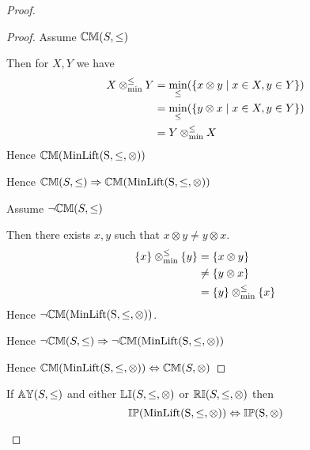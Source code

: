 \begin{proof}
\begin{proof}

\vspace{0.5em}

Assume ${\mathbb{CM}}(S,\leq)$

\begin{ind}
Then for $X,Y$ we have
\begin{align*}
X \mathbin{\otimes_{\min}^{\leq}} Y 	& = \min_\leq(\{x \otimes y \mid x \in X, y \in Y\}) \\
				& = \min_\leq(\{y \otimes x \mid x \in X, y \in Y\}) \\
				& = Y \mathbin{\otimes_{\min}^{\leq}} X
\end{align*}
Hence ${\mathbb{CM}}(\mathrm{MinLift(S,\leq,\otimes)})$
\end{ind}

Hence ${\mathbb{CM}}(S,\leq) \Rightarrow {\mathbb{CM}}(\mathrm{MinLift(S,\leq,\otimes)})$

\vspace{2em}

Assume $\neg {\mathbb{CM}}(S,\leq)$

\begin{ind}
Then there exists $x,y$ such that $x \otimes y \neq y \otimes x$.
\begin{align*}
\{ x \} \mathbin{\otimes_{\min}^{\leq}} \{ y \} 	& = \{x \otimes y\} \\	
							& \neq \{ y \otimes x \} \\
							& = \{ y \} \mathbin{\otimes_{\min}^{\leq}} \{ x \}
\end{align*}
Hence $\neg {\mathbb{CM}}(\mathrm{MinLift(S,\leq,\otimes)})$.
\end{ind}
Hence $\neg {\mathbb{CM}}(S,\leq) \Rightarrow \neg {\mathbb{CM}}(\mathrm{MinLift(S,\leq,\otimes)})$

\vspace{2em}

Hence ${\mathbb{CM}}(\mathrm{MinLift(S,\leq,\otimes)}) \Leftrightarrow {\mathbb{CM}}(S,\otimes)$
\end{proof}






\begin{theorem} \label{thm:minlift_ip}
If ${\mathbb{AY}}(S,\leq)$ and either ${\mathbb{LI}}(S,\leq,\otimes)$ or ${\mathbb{RI}}(S,\leq,\otimes)$ then
\begin{equation*}
{\mathbb{IP}}(\mathrm{MinLift(S,\leq,\otimes)}) \Leftrightarrow {\mathbb{IP}}(\mathrm{S,\otimes})
\end{equation*}
\end{theorem}



\end{proof}
